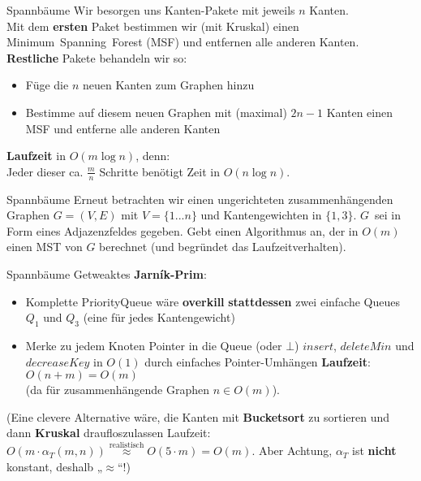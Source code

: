 \begin{frame}{Spannbäume}
	\solutionheading
	Wir besorgen uns Kanten-Pakete mit jeweils $n$ Kanten. \\
	Mit dem \textbf{ersten} Paket bestimmen wir (mit Kruskal) einen Minimum~Spanning~Forest (MSF) und entfernen alle anderen Kanten. \\
	\textbf{Restliche} Pakete behandeln wir so: \\
	\begin{itemize}
		\item Füge die $n$ neuen Kanten zum Graphen hinzu
		\item Bestimme auf diesem neuen Graphen mit (maximal) $2n-1$ Kanten einen MSF und entferne alle anderen Kanten
	\end{itemize}
	\impl \textbf{Laufzeit} in $O(m \log n)$, denn: \\
	Jeder dieser ca. $\frac{m}{n}$ Schritte benötigt Zeit in $O(n \log n)$.
\end{frame}

\begin{frame}{Spannbäume}
	Erneut betrachten wir einen ungerichteten zusammenhängenden Graphen $G = (V, E)$ mit $V = \{1...n\}$ und Kantengewichten in $\{1, 3\}$. $G$~sei in Form eines Adjazenzfeldes gegeben. Gebt einen Algorithmus an, der in $O(m)$ einen MST von $G$ berechnet (und begründet das Laufzeitverhalten).
\end{frame}

\begin{frame}{Spannbäume}
	\solutionheading
	Getweaktes \textbf{Jarník-Prim}: \\
	\begin{itemize}
		\item Komplette PriorityQueue wäre \textbf{overkill} \impl \textbf{stattdessen} zwei einfache Queues $Q_1$ und $Q_3$ \quad (eine für jedes Kantengewicht)
		\item Merke zu jedem Knoten Pointer in die Queue (oder $\bot$)
		\implitem $insert$, $deleteMin$ und $decreaseKey$ in $O(1)$ durch einfaches Pointer-Umhängen
		\implitem \textbf{Laufzeit}: $O(n + m) = O(m)$ \\ (da für zusammenhängende Graphen $n \in O(m)$).
	\end{itemize}
	\forcenewline
	\pause
	(Eine clevere Alternative wäre, die Kanten mit \textbf{Bucketsort} zu sortieren und dann \textbf{Kruskal} draufloszulassen \impl Laufzeit: $O\left(m \cdot \alpha_T(m, n)\right) \stackrel{\text{realistisch}}{\approx} O(5 \cdot m) = O(m)$. {\small Aber Achtung, $\alpha_T$ ist \textbf{nicht} konstant, deshalb „$\approx$“!})
\end{frame}



